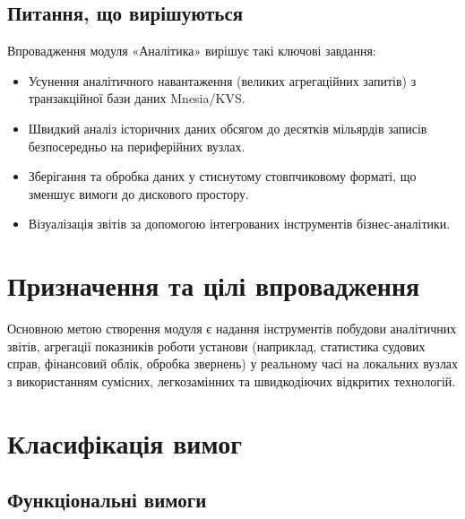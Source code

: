 \documentclass{article}
\begin{document}
\subsection{Питання, що вирішуються}
Впровадження модуля «Аналітика» вирішує такі ключові завдання:
\begin{itemize}
    \item Усунення аналітичного навантаження (великих агрегаційних запитів) з транзакційної бази даних Mnesia/KVS.
    \item Швидкий аналіз історичних даних обсягом до десятків мільярдів записів безпосередньо на периферійних вузлах.
    \item Зберігання та обробка даних у стиснутому стовпчиковому форматі, що зменшує вимоги до дискового простору.
    \item Візуалізація звітів за допомогою інтегрованих інструментів бізнес-аналітики.
\end{itemize}

\section{Призначення та цілі впровадження}
Основною метою створення модуля є надання інструментів побудови аналітичних звітів, агрегації показників роботи установи (наприклад, статистика судових справ, фінансовий облік, обробка звернень) у реальному часі на локальних вузлах з використанням сумісних, легкозамінних та швидкодіючих відкритих технологій.

\newpage
\section{Класифікація вимог}

\subsection{Функціональні вимоги}
\end{document}
